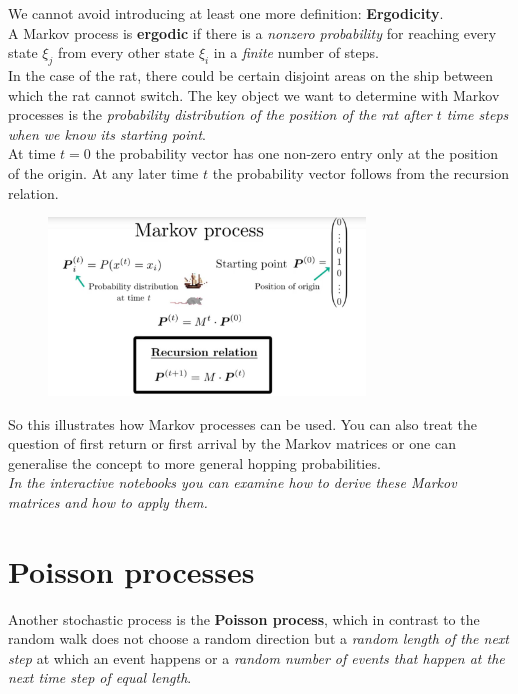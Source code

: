 \documentclass[12pt, a4paper]{scrartcl}
\begin{document}
We cannot avoid introducing at least one more definition: \textbf{Ergodicity}.\\
A Markov process is \textbf{ergodic} if there is a \textit{nonzero probability} for reaching every state $\xi_{j}$ from every other state $\xi_{i}$ in a \textit{finite} number of steps. \\%
In the case of the rat, there could be certain disjoint areas on the ship between which the rat cannot switch.
The key object we want to determine with Markov processes is the \textit{probability distribution of the position of the rat after $t$ time steps when we know its starting point}.\\
At time $t=0$ the probability vector has one non-zero entry only at the position of the origin. At any later time $t$ the probability vector follows from the recursion relation.%
 \begin{figure}[H]
	\centering
	\includegraphics[width=0.75\textwidth]{5_10.png}
\end{figure}
So this illustrates how Markov processes can be used. You can also treat the question of first return or first arrival by the Markov matrices or one can generalise the concept to more general hopping probabilities.\\
\textit{In the interactive notebooks you can examine how to derive these Markov matrices and how to apply them.}\\

 \section*{Poisson processes}
Another stochastic process is the \textbf{Poisson process}, which in contrast to the random walk does not choose a random direction but a \textit{random length of the next step} at which an event happens or a \textit{random number of events that happen at the next time step of equal length}.%
\end{document}
